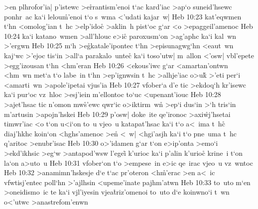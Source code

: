 >en
plhrofor'ia|
p'istewc
>e\r{r}rantism'enoi
t`ac
kard'iac
>ap`o
suneid'hsewc
ponhr~ac
ka`i
lelou\r{m}'enoi
t`o
s~wma
<'udati
kajar~w|\bibvsend
\vs Heb 10:23
kat'eqwmen
t`hn
<omolog'ian
t~hc
>elp'ido\r{c}
>aklin~h
pist`oc
g`ar
<o
>epaggeil'amenoc\bibvsend
\vs Heb 10:24
ka`i
katano~wmen
>all'hlouc
e>ic\r{}
paroxusm`on
>ag'aphc
ka`i
kal~wn
>'ergwn\bibvsend
\vs Heb 10:25
m`h
>e\r{g}katale'ipontec
t`hn
>episunagwg`hn
<eaut~wn
kaj`wc
>'ejoc
tis`in
>all`a
parakalo~unte\r{c}
ka`i
toso'utw|
m~allon
<'osw|
vbl'epete
>egg'izousan
t`hn
<hm'eran\bibvsend
\vs Heb 10:26
<ekous'iwc
g`ar
<amartan'ontwn
<hm~wn
met`a
t`o
labe~in
t`hn
>ep'ignwsin
t~hc
>alhje'iac
o>uk\r{}
>'eti
per`i
<amarti~wn
>apole'ipetai
vjus'ia\bibvsend
\vs Heb 10:27
vfober`a
d'e
tic
>ekdoq`h
kr'isewc
ka`i
pur`oc
vz~hloc
>esj'iein
m'ellontoc
to`uc
<upenant'iouc\bibvsend
\vs Heb 10:28
>ajet'hsac
tic
n'omon
mw\r{s}'ewc
qwr`ic
o>iktirm~w\r{n}
>ep`i
dus`in
>`h
tris`in
m'artusin
>apojn'hskei\bibvsend
\vs Heb 10:29
p'osw|
doke~ite
qe'ironoc
>axi\r{w}j'hsetai
timwr'iac
<o
t`on
u<i`on
to~u
vjeo~u
katapat'hsac
ka`i
t`o
a<~ima
t~h\r{c}
diaj'hkhc
koin`on
<hghs'amenoc
>en\r{}
<~w|
<hgi'asjh
ka`i
t`o
pne~uma
t~hc
q'aritoc
>enubr'isac\bibvsend
\vs Heb 10:30
o>'idamen
g`ar
t`on
e>ip'onta
>emo`i
>ekd'ikhsic
>eg`w
>antapod'wsw
l'egei\r{}
k'urioc
ka`i
p'alin
k'urioc\r{}
krine~i
t`on
la`on
a>uto~u\bibvsend
\vs Heb 10:31
vfober`on
t`o
>empese~in
e>ic
qe~irac
vjeo~u
vz~wntoc\bibvsend
\vs Heb 10:32
>anamimn'hskesje
d`e
t`ac
pr'oteron
<h\r{m}'erac
>en
a<~ic
vfwtisj'entec
poll`hn
>'ajlhsin
<upeme'inate
pajhm'atwn\bibvsend
\vs Heb 10:33
to~uto
m`en
>oneidismo~ic
te
ka`i
vjl'iyesin
vjea\r{t}riz'omenoi
to~uto
d`e
koinwno`i
t~wn
o<'utwc
>anastrefom'enwn
